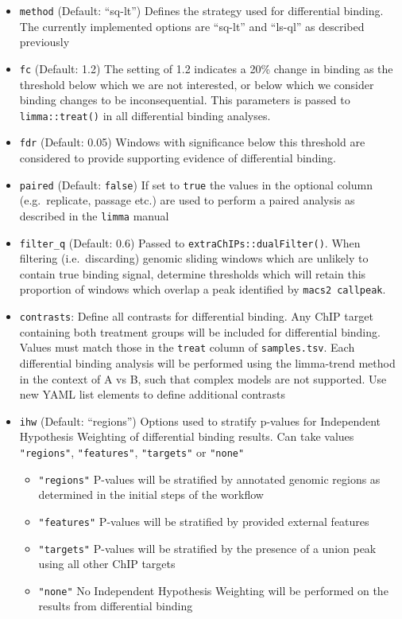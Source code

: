 \documentclass[
]{book}
\providecommand{\tightlist}{%
  \setlength{\itemsep}{0pt}\setlength{\parskip}{0pt}}
\begin{document}
\begin{itemize}
\tightlist
\item
  \texttt{method} (Default: ``sq-lt'') Defines the strategy used for differential binding. The currently implemented options are ``sq-lt'' and ``ls-ql'' as described previously
\item
  \texttt{fc} (Default: 1.2) The setting of 1.2 indicates a 20\% change in binding as the threshold below which we are not interested, or below which we consider binding changes to be inconsequential. This parameters is passed to \texttt{limma::treat()} \citep{treat} in all differential binding analyses.
\item
  \texttt{fdr} (Default: 0.05) Windows with significance below this threshold are considered to provide supporting evidence of differential binding.
\item
  \texttt{paired} (Default: \texttt{false}) If set to \texttt{true} the values in the optional column (e.g.~replicate, passage etc.) are used to perform a paired analysis as described in the \texttt{limma} manual
\item
  \texttt{filter\_q} (Default: 0.6) Passed to \texttt{extraChIPs::dualFilter()}. When filtering (i.e.~discarding) genomic sliding windows which are unlikely to contain true binding signal, determine thresholds which will retain this proportion of windows which overlap a peak identified by \texttt{macs2\ callpeak}.
\item
  \texttt{contrasts}: Define all contrasts for differential binding. Any ChIP target containing both treatment groups will be included for differential binding. Values must match those in the \texttt{treat} column of \texttt{samples.tsv}. Each differential binding analysis will be performed using the limma-trend method in the context of A vs B, such that complex models are not supported. Use new YAML list elements to define additional contrasts
\item
  \texttt{ihw} (Default: ``regions'') Options used to stratify p-values for Independent Hypothesis Weighting\citep{ihw} of differential binding results. Can take values \texttt{"regions"}, \texttt{"features"}, \texttt{"targets"} or \texttt{"none"}

  \begin{itemize}
  \tightlist
  \item
    \texttt{"regions"} P-values will be stratified by annotated genomic regions as determined in the initial steps of the workflow
  \item
    \texttt{"features"} P-values will be stratified by provided external features
  \item
    \texttt{"targets"} P-values will be stratified by the presence of a union peak using all other ChIP targets
  \item
    \texttt{"none"} No Independent Hypothesis Weighting will be performed on the results from differential binding
  \end{itemize}
\end{itemize}
\end{document}
